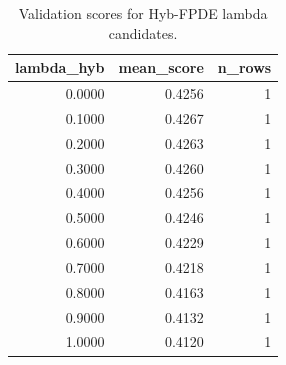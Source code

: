 \begin{table}[t]
\caption{Validation scores for Hyb-FPDE lambda candidates.}
\label{tab:lambda_distribution_computed}
\centering
\begin{tabular}{rrr}
\toprule
lambda\_hyb & mean\_score & n\_rows \\
\midrule
0.0000 & 0.4256 & 1 \\
0.1000 & 0.4267 & 1 \\
0.2000 & 0.4263 & 1 \\
0.3000 & 0.4260 & 1 \\
0.4000 & 0.4256 & 1 \\
0.5000 & 0.4246 & 1 \\
0.6000 & 0.4229 & 1 \\
0.7000 & 0.4218 & 1 \\
0.8000 & 0.4163 & 1 \\
0.9000 & 0.4132 & 1 \\
1.0000 & 0.4120 & 1 \\
\bottomrule
\end{tabular}

\end{table}
